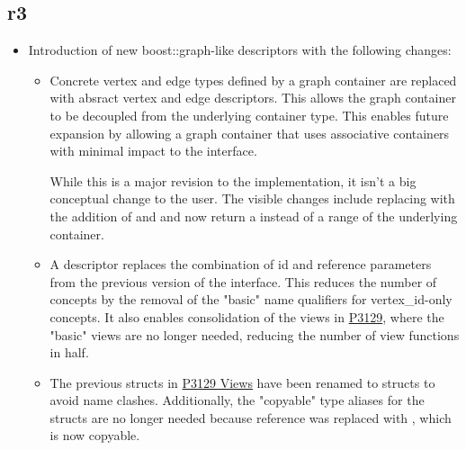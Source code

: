 \subsection*{\paperno r3}

\begin{itemize}
      \item Introduction of new boost::graph-like descriptors with the following changes:
            \begin{itemize}
                  \item Concrete vertex and edge types defined by a graph container are replaced with absract 
                        vertex and edge descriptors. This allows the graph container to be decoupled from the 
                        underlying container type. This enables future expansion by allowing a graph container 
                        that uses associative containers with minimal impact to the interface.

                        While this is a major revision to the implementation, it isn't a big conceptual change to the 
                        user. The visible changes include replacing  with 
                        the addition of 
                        and  and  now return a  instead 
                        of a range of the underlying container.
                  \item A descriptor replaces the combination of id and reference parameters from the previous version 
                        of the interface. This reduces the number of concepts by the removal of the "basic" name qualifiers 
                        for vertex\_id-only concepts. It also enables consolidation of the views in \href{https://www.wg21.link/P3129}{P3129},
                        where the "basic" views are no longer needed, reducing the number of view functions in half.
                  \item The previous  structs in \href{https://www.wg21.link/P3129}{P3129 Views} 
                        have been renamed to  structs to avoid name clashes. Additionally, the "copyable" 
                        type aliases for the  structs are no longer needed because reference was replaced
                        with , which is now copyable.
            \end{itemize}
\end{itemize}
